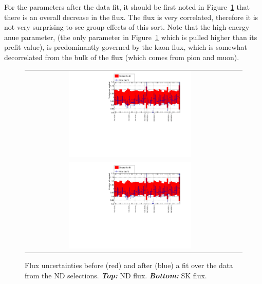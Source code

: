 For the parameters after the data fit, it should be first noted in
Figure~\ref{fig:dataflux} that there is an overall decrease in the
flux. The flux is very correlated, therefore it is not very surprising
to see group effects of this sort. Note that the high energy
\Gls{anue} parameter, (the only parameter in Figure~\ref{fig:dataflux}
which is pulled higher than its prefit value), is predominantly
governed by the kaon flux, which is somewhat decorrelated from the
bulk of the flux (which comes from pion and muon).

\begin{figure}[ht]
  \begin{center}
    \begin{adjustbox}{center}
      \begin{tabular}{cc}
        \includegraphics[width=0.6\textwidth,page=1]{images/BANFF/OutputData_histos.pdf}\\
        \includegraphics[width=0.6\textwidth,page=2]{images/BANFF/OutputData_histos.pdf}
      \end{tabular}
    \end{adjustbox}
    \caption[Flux uncertainties before and after a fit over the data
    from the ND280 selections]{Flux uncertainties before (red) and
      after (blue) a fit over the data from the \Gls{ND}
      selections. \textbf{\textit{Top:}} \Gls{ND}
      flux. \textbf{\textit{Bottom:}} \Gls{SK} flux.}
    \label{fig:dataflux}
  \end{center}
\end{figure}



